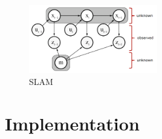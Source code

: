 \newline \begin{figure}[H]
    \centering
    \includegraphics[width=0.5\textwidth]{images/slam.png}
    \caption{SLAM}
\end{figure}


\section{Implementation}


